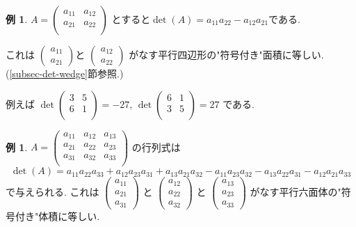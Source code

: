 \documentclass[dvipdfmx,a4paper,11pt]{article}
\theoremstyle{definition}
\newtheorem{exa}[thm]{例}
\begin{document}
\begin{exa}
\label{2jidet}
$A = 
  \begin{pmatrix}
a_{11}& a_{12}\\
a_{21}& a_{22}\\
 \end{pmatrix} 
$
とすると$\det(A) = a_{11}a_{22} - a_{12}a_{21}$である.

これは $
 \begin{pmatrix}
a_{11}\\ a_{21}
 \end{pmatrix}$と
$ \begin{pmatrix}
a_{12}\\a_{22} \end{pmatrix} $
がなす平行四辺形の"符号付き"面積に等しい. (\ref{subsec-det-wedge}節参照.)

例えば
$\det
 \begin{pmatrix}
3&5\\
6&1 \\
\end{pmatrix}
=-27
\text{, } 
\det
\begin{pmatrix}
6&1 \\
3&5\\
\end{pmatrix}
=
27
 $
 である.
\end{exa}

\begin{exa}
$A = 
  \begin{pmatrix}
a_{11}& a_{12} & a_{13}\\
a_{21}& a_{22} & a_{23}\\
a_{31}& a_{32} & a_{33}\\
 \end{pmatrix} 
$
の行列式は
$$
 \det(A)= 
 a_{11}a_{22}a_{33}+ a_{12}a_{23}a_{31}  +  a_{13}a_{21}a_{32} 
- a_{11}a_{23}a_{32}     - a_{13}a_{22}a_{31}  - a_{12}a_{21}a_{33}
  $$
 で与えられる. 
 これは
  $\begin{pmatrix}
a_{11}\\ a_{21}\\a_{31}
 \end{pmatrix}$
 と
  $\begin{pmatrix}
a_{12}\\ a_{22}\\a_{32}
 \end{pmatrix}$
 と
   $\begin{pmatrix}
a_{13}\\ a_{23}\\a_{33}
 \end{pmatrix}$
がなす平行六面体の"符号付き"体積に等しい. 

\end{exa}
\end{document}
